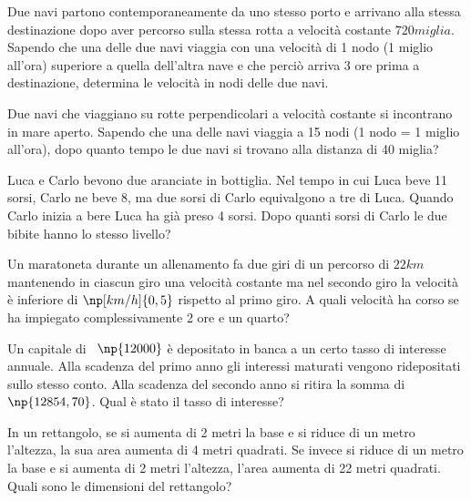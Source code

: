 \begin{multicols}{2}
\begin{esercizio}[\Ast]
 \label{ese:3.128}
Due navi partono contemporaneamente da uno stesso porto e arrivano alla
stessa destinazione dopo aver percorso sulla stessa rotta a velocità
costante $ 720\unit{miglia} $. Sapendo che una delle due navi viaggia con una velocità
di 1 nodo (1 miglio all'ora) superiore a quella dell'altra nave e che perciò
arriva 3 ore prima a destinazione, determina le velocità in nodi delle due
navi.
\end{esercizio}

\begin{esercizio}
 \label{ese:3.129}
Due navi che viaggiano su rotte perpendicolari a velocità costante si
incontrano in mare aperto. Sapendo che una delle navi viaggia a 15 nodi (1
nodo = 1 miglio all'ora), dopo quanto tempo le due navi si trovano alla
distanza di 40 miglia?
\end{esercizio}

\begin{esercizio}
 \label{ese:3.130}
Luca e Carlo bevono due aranciate in bottiglia. Nel tempo in cui Luca beve
11 sorsi, Carlo ne beve 8, ma due sorsi di Carlo equivalgono a tre di Luca.
Quando Carlo inizia a bere Luca ha già preso 4 sorsi. Dopo quanti sorsi di
Carlo le due bibite hanno lo stesso livello?
\end{esercizio}

\begin{esercizio}
 \label{ese:3.131}
Un maratoneta durante un allenamento fa due giri di un percorso di $22\unit{km}$
mantenendo in ciascun giro una velocità costante ma nel secondo giro la
velocità è inferiore di $\np[km/h]{0,5}$ rispetto al primo giro. A quali velocità
ha corso se ha impiegato complessivamente 2 ore e un quarto?
\end{esercizio}

\begin{esercizio}[\Ast]
 \label{ese:3.132}
Un capitale di \officialeuro~$\np{12000}$ è depositato in banca a un certo tasso di interesse
annuale. Alla scadenza del primo anno gli interessi maturati vengono
ridepositati sullo stesso conto. Alla scadenza del secondo anno si ritira la
somma di \officialeuro~$\np{12854,70}$. Qual è stato il tasso di interesse?
\end{esercizio}

\begin{esercizio}
 \label{ese:3.133}
In un rettangolo, se si aumenta di 2 metri la base e si riduce di un metro
l'altezza, la sua area aumenta di 4 metri quadrati. Se invece si riduce di
un metro la base e si aumenta di 2 metri l'altezza, l'area aumenta di 22
metri quadrati. Quali sono le dimensioni del rettangolo?
\end{esercizio}


\end{multicols}
